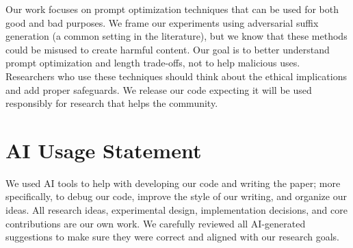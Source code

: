\documentclass[11pt]{article}
\begin{document}
Our work focuses on prompt optimization techniques that can be used for both good and bad purposes. We frame our experiments using adversarial suffix generation (a common setting in the literature), but we know that these methods could be misused to create harmful content. Our goal is to better understand prompt optimization and length trade-offs, not to help malicious uses. Researchers who use these techniques should think about the ethical implications and add proper safeguards. We release our code expecting it will be used responsibly for research that helps the community.

\section*{AI Usage Statement}

We used AI tools to help with developing our code and writing the paper; more specifically, to debug our code, improve the style of our writing, and organize our ideas. All research ideas, experimental design, implementation decisions, and core contributions are our own work.  We carefully reviewed all AI-generated suggestions to make sure they were correct and aligned with our research goals.



\appendix


\end{document}

